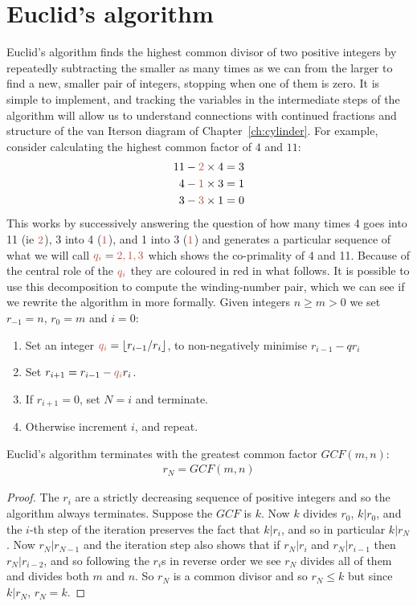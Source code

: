 \section{Euclid's algorithm}
\label{sec:euclid}
Euclid's algorithm finds the highest common divisor of two positive integers by repeatedly subtracting the smaller as many times as we can from the larger to find a new, smaller pair of integers,  stopping when one of them is zero. It is  simple to implement, and tracking the variables in the intermediate steps of the algorithm will allow us to understand connections with continued fractions and structure of the van Iterson diagram of Chapter~\ref{ch:cylinder}.
For example, consider calculating the highest common factor of $4$ and $11$:
\begin{align}
	11 - {\jHeadingColour 2}\times 4 & = 3 
	\\
	4 - {\jHeadingColour 1}\times 3 & = 1\label{eq:411}
	\\
	3 - {\jHeadingColour 3}\times 1 & = 0 
\end{align}
%
This works by successively answering the question of how many times 4 goes into 11 (ie ${\jHeadingColour 2}$), 3 into 4  (${\jHeadingColour 1}$), and 1 into 3 (${\jHeadingColour 1}$) and generates 
a particular sequence of what we will call  $\jqi={\jHeadingColour 2, 1, 3}$ which shows the co-primality of 4 and 11. Because of the central role of the $\jqi$ they are coloured in red in what follows. It is possible to use this decomposition to compute the winding-number pair, which we can see if we rewrite the algorithm in more formally. 
Given integers $n\geq m>0$  we set $r_{-1}=n$, $r_0=m$ and $i=0$:
\begin{enumerate}
	\item Set an integer $\jqi=\lfloor r_{i-1}/r_i \rfloor $, to non-negatively minimise $r_{i-1}-q r_{i}$ 
	\item  Set  $r_{i+1}=r_{i-1}-\jqi r_{i}$. 
	\item If $r_{i+1}=0$, set $N=i$ and terminate.
	\item Otherwise increment $i$, and repeat.
\end{enumerate}
\begin{theorem}
	Euclid's algorithm terminates with the greatest common factor $GCF(m,n)$:
	\begin{eqnarray}
		r_N =  
		GCF(m,n) 
	\end{eqnarray}
\end{theorem}
\begin{proof}
	The $r_i$ are a strictly decreasing sequence of positive integers and so the algorithm always terminates. Suppose the $GCF$ is $k$. Now $k$ divides $r_0$, $k|r_0$, and the $i$-th step of the iteration preserves the fact that  $k|r_i$,  and so in particular $k|r_N$. Now $r_N|r_{N-1}$ and the iteration step also shows that if $r_N|r_i$ and $r_N|r_{i-1}$ then $r_N|r_{i-2}$, and so following the $r_i$s in reverse order we see $r_N$ divides all of them and divides both $m$ and $n$.  So $r_N$ is a common divisor and so $r_N\leq k$ but since $k|r_N$, $r_N=k$. 
\end{proof}

